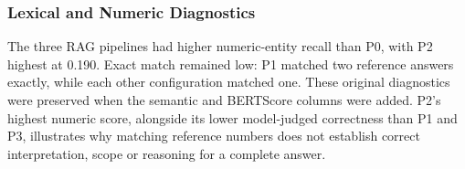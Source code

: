 \subsubsection{Lexical and Numeric Diagnostics}
\begin{table}[H]
\centering
\caption{Lexical and numeric comparison with the FinanceBench reference
answers. Exact match (EM) and token F1 use all 145 questions. Numeric metrics
use the 112 questions with extractable reference numbers and the corrected
numeric extractor. ``Numeric accuracy'' is the question-level proportion of
reference numeric entities matched, rather than a whole-answer correctness rate.}
\label{tab:main-answer-results}
\end{table}
The three RAG pipelines had higher numeric-entity recall than P0, with P2
highest at 0.190. Exact match remained low: P1 matched two reference answers
exactly, while each other configuration matched one. These original
diagnostics were preserved when the semantic and BERTScore columns were added.
P2's highest numeric score, alongside its lower model-judged correctness than
P1 and P3, illustrates why matching reference numbers does not establish
correct interpretation, scope or reasoning for a complete answer.

